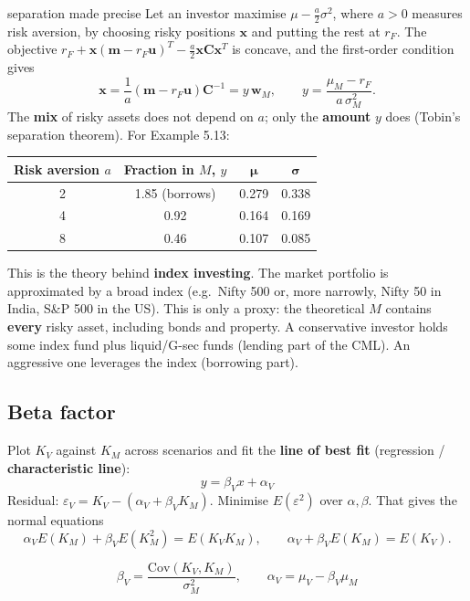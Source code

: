 \documentclass[titlepage,11pt,a4paper]{article}
\newcommand{\Cov}{\mathrm{Cov}}
\newcommand{\E}{E}
\newcommand{\vw}{\boldsymbol{w}}
\newcommand{\vm}{\boldsymbol{m}}
\newcommand{\vu}{\boldsymbol{u}}
\newcommand{\vC}{\boldsymbol{C}}
\newcommand{\T}{^{T}}
\newcommand{\Ci}{\vC^{-1}}
\begin{document}
\begin{deeper}{separation made precise}
Let an investor maximise $\mu-\tfrac a2\sigma^2$, where $a>0$ measures risk aversion, by choosing risky positions $\boldsymbol x$ and putting the rest at $r_F$. The objective $r_F+\boldsymbol x(\vm-r_F\vu)\T-\tfrac a2\boldsymbol x\vC\boldsymbol x\T$ is concave, and the first-order condition gives
\[\boldsymbol x=\frac1a(\vm-r_F\vu)\Ci=y\,\vw_M,\qquad y=\frac{\mu_M-r_F}{a\,\sigma_M^2}.\]
The \textbf{mix} of risky assets does not depend on $a$; only the \textbf{amount} $y$ does (Tobin's separation theorem). For Example 5.13:

\begin{center}\renewcommand{\arraystretch}{1.2}
\begin{tabular}{cccc}
\toprule
\textbf{Risk aversion $a$} & \textbf{Fraction in $M$, $y$} & $\boldsymbol\mu$ & $\boldsymbol\sigma$\\
\midrule
2 & 1.85 (borrows) & 0.279 & 0.338\\
4 & 0.92 & 0.164 & 0.169\\
8 & 0.46 & 0.107 & 0.085\\
\bottomrule
\end{tabular}
\end{center}
\end{deeper}

\begin{practice}
This is the theory behind \textbf{index investing}. The market portfolio is approximated by a broad index (e.g.\ Nifty 500 or, more narrowly, Nifty 50 in India, S\&P 500 in the US). This is only a proxy: the theoretical $M$ contains \textbf{every} risky asset, including bonds and property. A conservative investor holds some index fund plus liquid/G-sec funds (lending part of the CML). An aggressive one leverages the index (borrowing part).
\end{practice}

\subsection{Beta factor}
Plot $K_V$ against $K_M$ across scenarios and fit the \textbf{line of best fit} (regression / \textbf{characteristic line}):
\[y=\beta_Vx+\alpha_V\]
Residual: $\varepsilon_V=K_V-(\alpha_V+\beta_VK_M)$. Minimise $\E(\varepsilon^2)$ over $\alpha,\beta$. That gives the normal equations
\[\alpha_V\E(K_M)+\beta_V\E(K_M^2)=\E(K_VK_M),\qquad \alpha_V+\beta_V\E(K_M)=\E(K_V).\]

\begin{result}
\[\beta_V=\frac{\Cov(K_V,K_M)}{\sigma_M^2},\qquad \alpha_V=\mu_V-\beta_V\mu_M\]
\end{result}
\end{document}
